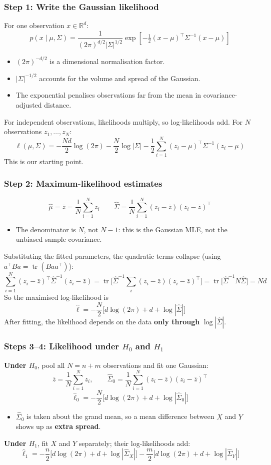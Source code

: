 \documentclass{beamer}
\begin{document}
\begin{frame}[t]
\frametitle{Step 1: Write the Gaussian likelihood}
\small
For one observation $x\in\mathbb{R}^d$:
\[
p(x\mid\mu,\Sigma)=\frac{1}{(2\pi)^{d/2}|\Sigma|^{1/2}}
\exp\!\left[-\tfrac12(x-\mu)^\top\Sigma^{-1}(x-\mu)\right]
\]
\begin{itemize}
    \item $(2\pi)^{-d/2}$ is a dimensional normalisation factor.
    \item $|\Sigma|^{-1/2}$ accounts for the volume and spread of the Gaussian.
    \item The exponential penalises observations far from the mean in covariance-adjusted distance.
\end{itemize}
For independent observations, likelihoods multiply, so log-likelihoods add. For $N$ observations $z_1,\dots,z_N$:
\[
\ell(\mu,\Sigma)=-\frac{Nd}{2}\log(2\pi)-\frac N2\log|\Sigma|
-\frac12\sum_{i=1}^{N}(z_i-\mu)^\top\Sigma^{-1}(z_i-\mu)
\]
This is our starting point.
\end{frame}

\begin{frame}[t]
\frametitle{Step 2: Maximum-likelihood estimates}
\small
\[
\boxed{\hat\mu=\bar z=\frac1N\sum_{i=1}^N z_i}
\qquad
\boxed{\hat\Sigma=\frac1N\sum_{i=1}^N(z_i-\bar z)(z_i-\bar z)^\top}
\]
\begin{itemize}
    \item The denominator is $N$, not $N-1$: this is the Gaussian MLE, not the unbiased sample covariance.
\end{itemize}
Substituting the fitted parameters, the quadratic terms collapse (using $a^\top Ba=\operatorname{tr}(Baa^\top)$):
\[
\sum_{i=1}^N(z_i-\bar z)^\top\hat\Sigma^{-1}(z_i-\bar z)
=\operatorname{tr}\!\Big[\hat\Sigma^{-1}\textstyle\sum_i(z_i-\bar z)(z_i-\bar z)^\top\Big]
=\operatorname{tr}\big[\hat\Sigma^{-1}N\hat\Sigma\big]=Nd
\]
So the maximised log-likelihood is
\[
\boxed{\hat\ell=-\frac N2\Big[d\log(2\pi)+d+\log|\hat\Sigma|\Big]}
\]
After fitting, the likelihood depends on the data \textbf{only through} $\log|\hat\Sigma|$.
\end{frame}

\begin{frame}[t]
\frametitle{Steps 3--4: Likelihood under $H_0$ and $H_1$}
\small
\textbf{Under $H_0$}, pool all $N=n+m$ observations and fit one Gaussian:
\[
\bar z=\frac1N\sum_{i=1}^N z_i,\qquad
\hat\Sigma_0=\frac1N\sum_{i=1}^N(z_i-\bar z)(z_i-\bar z)^\top
\]
\[
\hat\ell_0=-\frac N2\Big[d\log(2\pi)+d+\log|\hat\Sigma_0|\Big]
\]
\begin{itemize}
    \item $\hat\Sigma_0$ is taken about the grand mean, so a mean difference between $X$ and $Y$ shows up as \textbf{extra spread}.
\end{itemize}
\textbf{Under $H_1$}, fit $X$ and $Y$ separately; their log-likelihoods add:
\[
\hat\ell_1=-\frac n2\Big[d\log(2\pi)+d+\log|\hat\Sigma_X|\Big]
-\frac m2\Big[d\log(2\pi)+d+\log|\hat\Sigma_Y|\Big]
\]
\end{frame}
\end{document}
